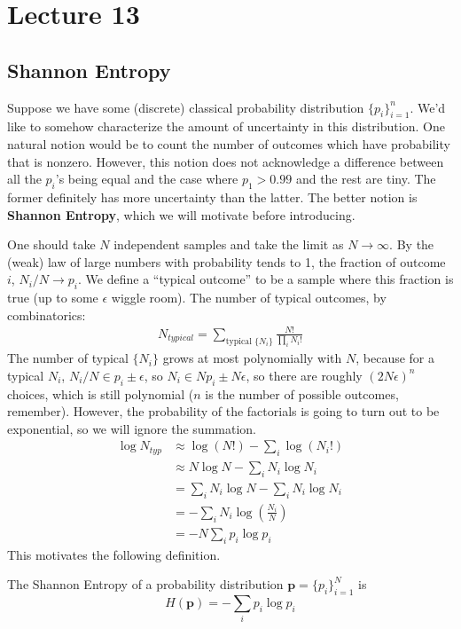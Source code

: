 \section{Lecture 13}

\subsection{Shannon Entropy}
Suppose we have some (discrete) classical probability distribution $\{p_i\}_{i = 1}^n$. We'd like to somehow
characterize the amount of uncertainty in this distribution. One natural notion would be to count the number of outcomes which
have probability that is nonzero. However, this notion does not acknowledge a difference between all the $p_i$'s being equal
and the case where $p_1 > 0.99$ and the rest are tiny. The former definitely has more uncertainty than the latter.
The better notion is \textbf{Shannon Entropy}, which we will motivate before introducing.

One should take $N$ independent samples and take the limit as $N \to \infty$. By the (weak) law of large numbers
with probability tends to 1, the fraction of outcome $i$, $N_i/N \to p_i$. We define a ``typical outcome'' to be a sample where
this fraction is true (up to some $\epsilon$ wiggle room). The number of typical outcomes, by combinatorics:
\begin{align*}
    N_{typical} = \sum_{\text{typical } \{N_i\}}\frac{N!}{\prod_{i} N_i!}
\end{align*}
The number of typical $\{N_i\}$ grows at most polynomially with $N$, because for a typical $N_i$,
$N_i/N \in p_i \pm \epsilon$, so $N_i \in Np_i \pm N \epsilon$, so there are roughly $(2N \epsilon)^n$ choices,
which is still polynomial ($n$ is the number of possible outcomes, remember). However, the probability of the factorials is
going to turn out to be exponential, so we will ignore the summation.
\begin{align*}
    \log N_{typ} &\approx \log (N!) - \sum_i \log (N_i!) \\
    &\approx N \log N - \sum_i N_i \log N_i \\
    &= \sum_i N_i \log N - \sum_i N_i \log N_i \\
    &= - \sum_i N_i \log \left(\frac{N_i}{N}\right) \\
    &= - N \sum_i p_i \log p_i
\end{align*}
This motivates the following definition.

\begin{definition}
    The Shannon Entropy of a probability distribution $\mathbf{p} = \{p_i\}_{i = 1}^N$ is
    \[ H(\mathbf{p}) = -\sum_i p_i \log p_i \] 
\end{definition}

